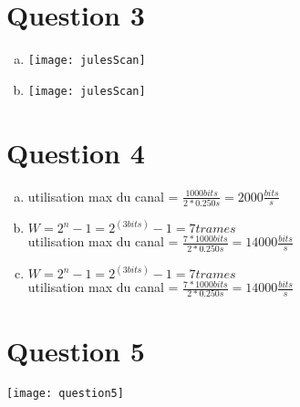 \section{Question 3}

\begin{enumerate}[(a)]
	\item
		\parbox{\linewidth}{\centering
		\texttt{[image: julesScan]}
		}
	\item
		\parbox{\linewidth}{\centering
		\texttt{[image: julesScan]}
		}
\end{enumerate}


\section{Question 4}
\begin{enumerate}[(a)]
	\item 
		utilisation max du canal = $\frac{1000 bits}{2 * 0.250s} = 2000\frac{bits}{s}$
	\item
		$W = 2^n-1 = 2^(3bits)-1 = 7 trames$\\
		utilisation max du canal = $\frac{7 * 1000 bits}{2 * 0.250s} = 14000\frac{bits}{s}$
	\item
		$W = 2^n-1 = 2^(3bits)-1 = 7 trames$\\
		utilisation max du canal = $\frac{7 * 1000 bits}{2 * 0.250s} = 14000\frac{bits}{s}$
\end{enumerate}

\section{Question 5}
\parbox{\linewidth}{\centering
\texttt{[image: question5]}
}


